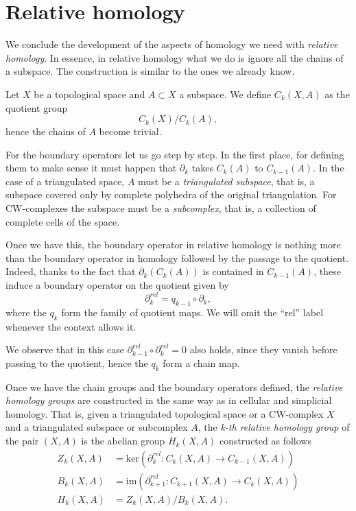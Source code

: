 
\section{Relative homology}
\label{sec:hom_relat}

We conclude the development of the aspects of homology we need with \textit{relative homology}. In essence, in relative homology what we do is ignore all the chains of a subspace. The construction is similar to the ones we already know.

\begin{definition}
    Let $X$ be a topological space and $A\subset X$ a subspace. We define $C_k(X,A)$ as the quotient group
    \begin{equation*}
        C_k(X)/C_k(A),
    \end{equation*}
    hence the chains of $A$ become trivial.
\end{definition}

For the boundary operators let us go step by step. In the first place, for defining them to make sense it must happen that $\partial_k$ takes $C_k(A)$ to $C_{k-1}(A)$. In the case of a triangulated space, $A$ must be a \textit{triangulated subspace}, that is, a subspace covered only by complete polyhedra of the original triangulation. For CW-complexes the subspace must be a \textit{subcomplex}, that is, a collection of complete cells of the space.

Once we have this, the boundary operator in relative homology is nothing more than the boundary operator in homology followed by the passage to the quotient. Indeed, thanks to the fact that $\partial_k(C_k(A))$ is contained in $C_{k-1}(A)$, these induce a boundary operator on the quotient given by
\begin{equation*}
    \partial^{rel}_k = q_{k-1}\circ\partial_k,
\end{equation*}
where the $q_k$ form the family of quotient maps. We will omit the ``rel'' label whenever the context allows it.

We observe that in this case $\partial^{rel}_{k-1}\circ \partial^{rel}_k = 0$ also holds, since they vanish before passing to the quotient, hence the $q_k$ form a chain map.

\newpage
Once we have the chain groups and the boundary operators defined, the \textit{relative homology groups} are constructed in the same way as in cellular and simplicial homology. That is, given a triangulated topological space or a CW-complex $X$ and a triangulated subspace or subcomplex $A$, the \textit{k-th relative homology group} of the pair $(X,A)$ is the abelian group $H_k(X,A)$ constructed as follows
\begin{align*}
    Z_k(X,A) &= \text{ker}(\partial^{rel}_k: C_k(X,A) \to C_{k-1}(X,A)) \\
    B_k(X,A) &= \text{im}(\partial^{rel}_{k+1}: C_{k+1}(X,A) \to C_{k}(X,A)) \\
    H_k(X,A) &= Z_k(X,A)/B_k(X,A).
\end{align*}

